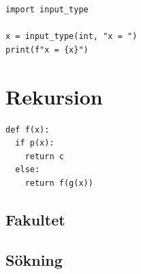 \begin{frame}[fragile]
  \begin{example}
    \begin{lstlisting}
import input_type

x = input_type(int, "x = ")
print(f"x = {x}")
    \end{lstlisting}
  \end{example}
\end{frame}


\section{Rekursion}

\begin{frame}[fragile]
  \begin{lstlisting}[basicstyle=\huge,numbers=none]
def f(x):
  if p(x):
    return c
  else:
    return f(g(x))
  \end{lstlisting}
\end{frame}

\subsection{Fakultet}

\begin{frame}[fragile]
  \begin{example}
    
  \end{example}
\end{frame}

\begin{frame}[fragile]
  \begin{example}
    
  \end{example}
\end{frame}

\subsection{Sökning}

\begin{frame}[fragile]
  \begin{example}
    
  \end{example}
\end{frame}

